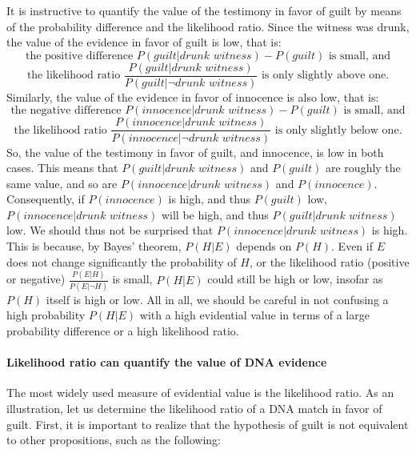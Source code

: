 \documentclass[10pt]{article}
\begin{document}
It is instructive to quantify the value of the testimony in favor of guilt by means of 
the probability difference and the likelihood ratio. Since the witness was drunk, the value of the evidence in favor of guilt is 
low, that is:
%
\[\text{the positive difference $P(\textit{guilt} | \textit{drunk witness}) - P(\textit{guilt})$ is small, and}\]
%
%
\[\text{the likelihood ratio $\frac{P(\textit{guilt} | \textit{drunk witness})}{P(\textit{guilt} | \neg\textit{drunk witness})}$ is only slightly above one}.\] 
%
Similarly, the value of the evidence in favor of innocence is also low, that is:
%
\[\text{the negative difference $P(\textit{innocence} | \textit{drunk witness}) - P(\textit{guilt})$ is small, and}\]
%
%
\[\text{the likelihood ratio $\frac{P(\textit{innocence} | \textit{drunk witness})}{P(\textit{innocence} | \neg\textit{drunk witness})}$ is only slightly below one}.\] 
%
So, the value of the testimony in favor of guilt, and innocence, is low 
in both cases. This means that $P(\textit{guilt} | \textit{drunk witness})$
and $P(\textit{guilt})$ are roughly the same value, and so are $P(\textit{innocence} | \textit{drunk witness})$ 
and $P(\textit{innocence})$. Consequently, if $P(\textit{innocence})$ is high, 
and thus $P(\textit{guilt})$ low, $P(\textit{innocence} | \textit{drunk witness})$ will 
be high, and thus $P(\textit{guilt} | \textit{drunk witness})$ low. %
We should thus not be surprised that $P(\textit{innocence} | \textit{drunk witness})$ is high. 
This is because, by Bayes' theorem, $P(H|E)$ depends on $P(H)$.  
Even if $E$ does not change significantly the probability of $H$, or the likelihood ratio (positive or negative) 
$\frac{P(E|H)}{P(E| \neg H)}$ is small, $P(H|E)$ could still be high or low, insofar as $P(H)$ itself is high or low. 
All in all, we should be careful in not confusing a high probability $P(H|E)$ with a high 
evidential value in terms of a large probability difference or a high likelihood ratio.


\paragraph{Likelihood ratio can quantify the value of DNA evidence}



The most widely used measure of evidential value 
is the likelihood ratio. As an illustration, let us determine the likelihood ratio 
of a DNA match in favor of guilt. %
First, it is important to realize that the hypothesis of guilt is not equivalent to 
other propositions, such as the following: %
\end{document}
